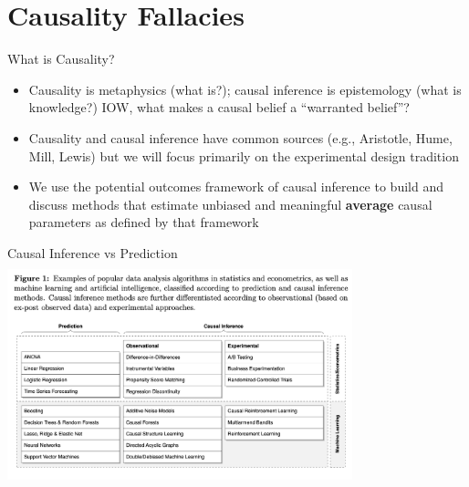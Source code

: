 \documentclass{beamer}
\begin{document}
\section{Causality Fallacies}


\begin{frame}{What is Causality?}

\begin{itemize}
\item Causality is metaphysics (what is?); causal inference is epistemology (what is knowledge?) IOW, what makes a causal belief a ``warranted belief''?
\item Causality and causal inference have common sources (e.g., Aristotle, Hume, Mill, Lewis) but we will focus primarily on the experimental design tradition
\item We use the potential outcomes framework of causal inference to build and discuss methods that estimate unbiased and meaningful \textbf{average} causal parameters as defined by that framework
\end{itemize}

\end{frame}


\begin{frame}{Causal Inference vs Prediction}
  \centering
  \includegraphics[scale=0.5,height=6.5cm, width=10cm]{./lecture_includes/prediction_causality.png}
\end{frame}
\end{document}
